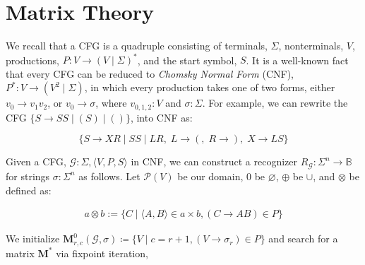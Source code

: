 \documentclass[sigplan,nonacm]{acmart}\settopmatter{printfolios=false,printccs=false,printacmref=false}
\begin{document}


\section{Matrix Theory}

We recall that a CFG is a quadruple consisting of terminals, $\Sigma$, nonterminals, $V$, productions, $P: V \rightarrow (V \mid \Sigma)^*$, and the start symbol, $S$. It is a well-known fact that every CFG can be reduced to \textit{Chomsky Normal Form} (CNF), $P^*: V \rightarrow (V^2 \mid \Sigma)$, in which every production takes one of two forms, either $v_0 \rightarrow v_1 v_2$, or $v_0 \rightarrow \sigma$, where $v_{0, 1, 2}: V$ and $\sigma: \Sigma$. For example, we can rewrite the CFG $\{S \rightarrow S S \mid ( S ) \mid ()\}$, into CNF as:\vspace{-10pt}

\[
\{S\rightarrow XR \mid SS \mid LR,\; L \rightarrow (,\; R \rightarrow ),\; X\rightarrow LS\}
\]

\noindent Given a CFG, $\mathcal{G} : \Sigma, \langle V, P, S\rangle$ in CNF, we can construct a recognizer $R_\mathcal{G}: \Sigma^n \rightarrow \mathbb{B}$ for strings $\sigma: \Sigma^n$ as follows. Let $\mathcal P(V)$ be our domain, $0$ be $\varnothing$, $\oplus$ be $\cup$, and $\otimes$ be defined as:\vspace{-10pt}

\begin{align}
a \otimes b := \{C \mid \langle A, B\rangle \in a \times b, (C\rightarrow AB) \in P\}
\end{align}

\noindent We initialize $\mathbf{M}^0_{r,c}(\mathcal{G}, \sigma) \coloneqq \{V \mid c = r + 1, (V \rightarrow \sigma_r) \in P\}$ and search for a matrix $\mathbf{M}^*$ via fixpoint iteration,\vspace{-10pt}
\end{document}
